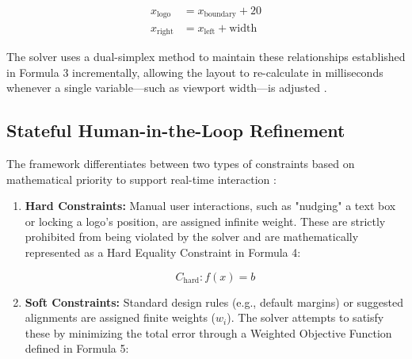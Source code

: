 \begin{refsection}
\begin{center}
\begin{minipage}{0.8\textwidth}
\begin{equation}
\begin{aligned}
x_{\text{logo}} &= x_{\text{boundary}} + 20 \\
x_{\text{right}} &= x_{\text{left}} + \text{width}
\end{aligned}
\end{equation}
\centering
\end{minipage}
\end{center}

The solver uses a dual-simplex method to maintain these relationships established in Formula 3 incrementally, allowing the layout to re-calculate in milliseconds whenever a single variable—such as viewport width—is adjusted \cite{Li2024SMT}.

\subsection{Stateful Human-in-the-Loop Refinement}
The framework differentiates between two types of constraints based on mathematical priority to support real-time interaction \cite{Li2024SMT}:

\begin{enumerate}
    \item \textbf{Hard Constraints:} Manual user interactions, such as "nudging" a text box or locking a logo's position, are assigned infinite weight. These are strictly prohibited from being violated by the solver and are mathematically represented as a Hard Equality Constraint in Formula 4:

    \begin{center}
    \begin{minipage}{0.8\textwidth}
    \begin{equation}
    C_{\text{hard}} : f(x) = b
    \end{equation}
    \centering
    \end{minipage}
    \end{center}
	
	\item \textbf{Soft Constraints:} Standard design rules (e.g., default margins) or suggested alignments are assigned finite weights ($w_i$). The solver attempts to satisfy these by minimizing the total error through a Weighted Objective Function defined in Formula 5:


\end{enumerate}
\end{refsection}
